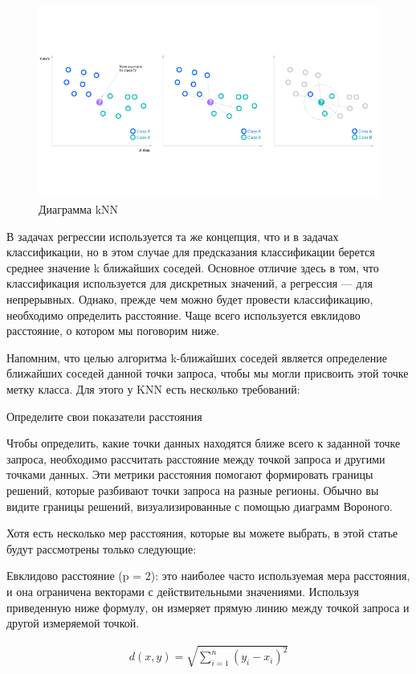 \begin{figure}[h]
\includegraphics[width=0.75\columnwidth]{./img/knn_diagramma.png}
\centering
\caption{Диаграмма kNN}
\label{pic:knn_diagramma}
\end{figure}

В задачах регрессии используется та же концепция, что и в задачах классификации, 
но в этом случае для предсказания классификации берется среднее значение k ближайших соседей. 
Основное отличие здесь в том, что классификация используется для дискретных значений, 
а регрессия — для непрерывных. Однако, прежде чем можно будет провести классификацию, 
необходимо определить расстояние. Чаще всего используется евклидово расстояние, 
о котором мы поговорим ниже.

Напомним, что целью алгоритма k-ближайших соседей является определение ближайших соседей данной точки запроса, чтобы мы могли присвоить этой точке метку класса. Для этого у KNN есть несколько требований:

Определите свои показатели расстояния

Чтобы определить, какие точки данных находятся ближе всего к заданной точке запроса,
необходимо рассчитать расстояние между точкой запроса и другими точками данных. 
Эти метрики расстояния помогают формировать границы решений, которые разбивают точки
запроса на разные регионы. Обычно вы видите границы решений, визуализированные с помощью диаграмм Вороного.

Хотя есть несколько мер расстояния, которые вы можете выбрать, в этой статье будут рассмотрены только следующие:

Евклидово расстояние (p = 2): это наиболее часто используемая мера расстояния, 
и она ограничена векторами с действительными значениями. 
Используя приведенную ниже формулу, он измеряет прямую линию между точкой запроса и другой измеряемой точкой.

\begin{equation}
  \begin{gathered}
    d(x, y) = \sqrt{\sum_{i=1}^n(y_i-x_i)^2}
  \end{gathered}
  \label{eq:speach_formula_20}
\end{equation}

